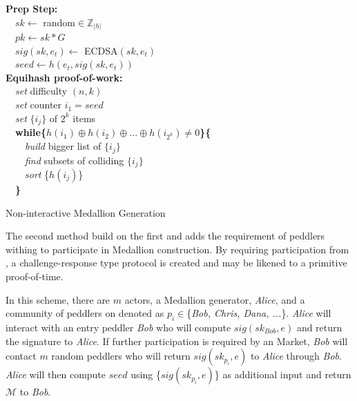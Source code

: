 \begin{algorithm}[H]


   \textbf{Prep Step:}\\
    ~~$sk\gets$ random$\in \mathbb{Z}_{|h|}$\\
    ~~$pk\gets sk*G$\\
    ~~$sig(sk,e_t)\gets$ ECDSA$(sk,e_t)$\\
    ~~$seed\gets h(e_t, sig(sk,e_t))$ \\
   \textbf{Equihash proof-of-work:}\\
    ~~\textit{set} difficulty $(n,k)$\\
    ~~\textit{set} counter $i_1 = seed$\\
    ~~\textit{set} $\{i_j\}$ of $2^k$ items\\
    ~~\textbf{while\{}$h(i_1) \oplus h(i_2) \oplus ...\oplus h(i_{2^k}) \neq 0$\textbf{\}\{}\\
     ~~~~\textit{build} bigger list of $\{i_j\}$\\
     ~~~~\textit{find} subsets of colliding $\{i_j\}$\\
     ~~~~\textit{sort} \{$h(i_j)$\}\\
    ~~\textbf{\}}\\
    
   \caption{Non-interactive Medallion Generation}
\end{algorithm}

The second method build on the first and adds the requirement of peddlers withing \tOM{} to participate in Medallion construction. By requiring participation from \tOM{}, a challenge-response type protocol is created and may be likened to a primitive proof-of-time.

In this scheme, there are $m$ actors, a Medallion generator, \textit{Alice}, and a community of peddlers on \tOM{} denoted as $p_i \in$\{\textit{Bob, Chris, Dana, ...}\}. \textit{Alice} will interact with an entry peddler \textit{Bob} who will compute $sig(sk_{Bob}, e)$ and return the signature to \textit{Alice}. If further participation is required by an \Orchid{} Market, \textit{Bob} will contact $m$ random peddlers who will return $sig(sk_{p_i}, e)$ to \textit{Alice} through  \textit{Bob}. \textit{Alice} will then compute $seed$ using \{$sig(sk_{p_i}, e)$\} as additional input and return $\mathcal{M}$ to \textit{Bob}. 

